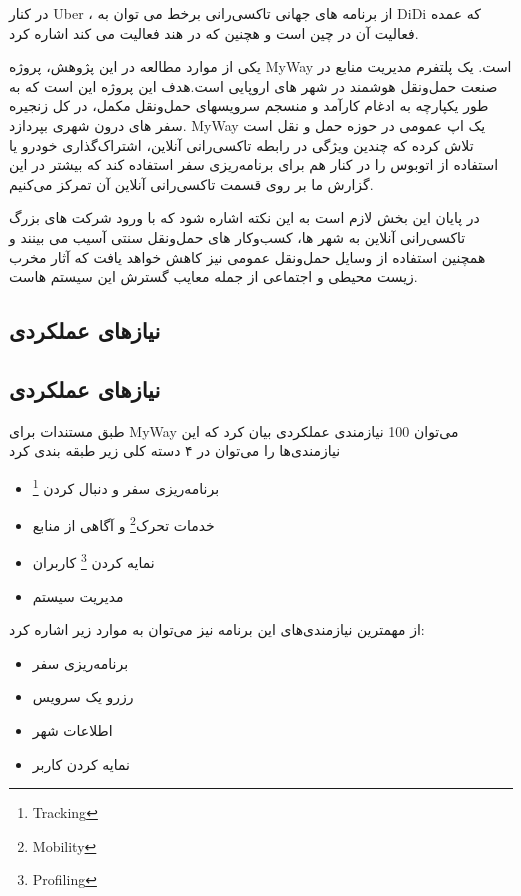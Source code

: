 در کنار Uber ، از برنامه های جهانی تاکسی‌رانی برخط می توان به DiDi که عمده فعالیت آن در چین است و هچنین  که در هند فعالیت می کند اشاره کرد.

یکی از موارد مطالعه در این پژوهش، پروژه MyWay است. یک پلتفرم مدیریت منابع در صنعت حمل‌و‌نقل هوشمند در شهر های اروپایی است.هدف این پروژه این است که به طور یکپارچه به ادغام کارآمد و منسجم  سرویسهای حمل‌و‌نقل مکمل، در کل زنجیره سفر های درون شهری بپردازد.
MyWay
یک اپ عمومی در حوزه حمل و نقل است تلاش کرده که چندین ویژگی در رابطه تاکسی‌رانی آنلاین، اشتراک‌گذاری خودرو یا استفاده از اتوبوس را در کنار هم برای برنامه‌ریزی سفر استفاده کند که بیشتر در این گزارش ما بر روی قسمت تاکسی‌رانی آنلاین آن تمرکز می‌کنیم.

در پایان این بخش لازم است به این نکته اشاره شود که با ورود شرکت های بزرگ تاکسی‌رانی آنلاین به شهر ها، کسب‌و‌کار های حمل‌و‌نقل سنتی آسیب می بینند و همچنین استفاده از وسایل حمل‌و‌نقل عمومی نیز کاهش خواهد یافت که آثار مخرب زیست محیطی و اجتماعی از جمله معایب گسترش این سیستم هاست.

\subsection{نیازهای عملکردی }

\subsection{نیازهای عملکردی }

طبق مستندات \cite{myway_req}برای MyWay می‌توان 100 نیازمندی عملکردی بیان کرد که این نیازمندی‌ها را می‌توان در ۴ دسته کلی زیر طبقه بندی کرد

\begin{itemize}
\item
برنامه‌ریزی سفر و دنبال کردن \footnote{Tracking}
\item 
خدمات تحرک\footnote{Mobility} و آگاهی از منابع
\item 
نمایه کردن \footnote{Profiling} کاربران 
\item 
مدیریت سیستم
\end{itemize} 


از مهمترین نیازمندی‌های این برنامه نیز می‌توان به موارد زیر اشاره کرد:
\begin{itemize}
\item
برنامه‌ریزی سفر
\item
رزرو یک سرویس
\item 
اطلاعات شهر 
\item
نمایه کردن کاربر 
\end{itemize}

